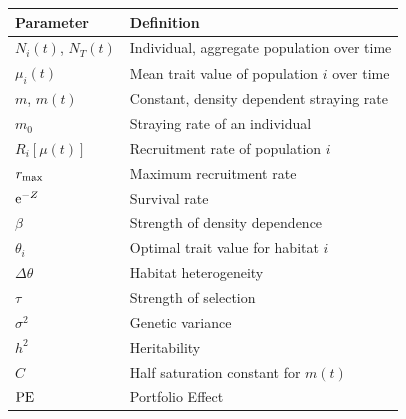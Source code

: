\documentclass{revtex4}
\begin{document}
\begin{center}
\begin{tabular}{ l|l }
\hline
Parameter & Definition \\
\hline
$N_i(t)$, $N_T(t)$ & Individual, aggregate population over time\\
$\mu_i(t)$ & Mean trait value of population $i$ over time\\
$m$, $m(t)$ & Constant, density dependent straying rate\\
$m_0$ & Straying rate of an individual\\
$R_i[\mu(t)]$ & Recruitment rate of population $i$\\
$r_{\rm max}$ & Maximum recruitment rate\\
${\rm e}^{-Z}$ & Survival rate\\
$\beta$ & Strength of density dependence\\
$\theta_i$ & Optimal trait value for habitat $i$\\
$\Delta\theta$ & Habitat heterogeneity\\
$\tau$ & Strength of selection\\
$\sigma^2$ & Genetic variance\\
$h^2$ & Heritability\\
$C$ & Half saturation constant for $m(t)$\\
${\rm PE}$ & Portfolio Effect\\
\hline
\end{tabular}
\end{center}


\clearpage
\end{document}
